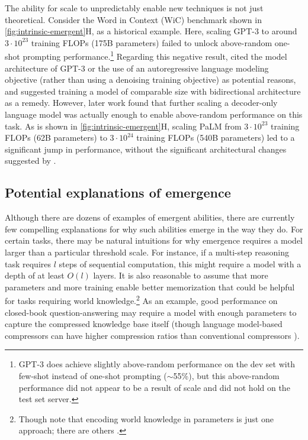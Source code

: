 \documentclass[10pt]{article} %
\begin{document}
The ability for scale to unpredictably enable new techniques is not just theoretical.
Consider the Word in Context (WiC) benchmark \citep{pilehvar-camacho-collados-2019-wic} shown in \cref{fig:intrinsic-emergent}H, as a historical example.
Here, scaling GPT-3 to around $3 \cdot 10^{23}$ training FLOPs (175B parameters) failed to unlock above-random one-shot prompting performance.\footnote{GPT-3 does achieve slightly above-random performance on the dev set with few-shot instead of one-shot prompting ($\sim$55\%), but this above-random performance did not appear to be a result of scale and did not hold on the test set server.}
Regarding this negative result, \citet{brown2020language} cited the model architecture of GPT-3 or the use of an autoregressive language modeling objective (rather than using a denoising training objective) as potential reasons, and suggested training a model of comparable size with bidirectional architecture as a remedy.
However, later work found that further scaling a decoder-only language model was actually enough to enable above-random performance on this task.
As is shown in \cref{fig:intrinsic-emergent}H, scaling PaLM \citep{chowdhery2022palm} from $3 \cdot 10^{23}$ training FLOPs (62B parameters) to $3 \cdot 10^{24}$ training FLOPs (540B parameters) led to a significant jump in performance, without the significant architectural changes suggested by \citet{brown2020language}.

\subsection{Potential explanations of emergence}\label{subsec:potential_explanations}
Although there are dozens of examples of emergent abilities, there are currently few compelling explanations for why such abilities emerge in the way they do.
For certain tasks, there may be natural intuitions for why emergence requires a model larger than a particular threshold scale.
For instance, if a multi-step reasoning task requires $l$ steps of sequential computation, this might require a model with a depth of at least $O\left(l\right)$ layers.
It is also reasonable to assume that more parameters and more training enable better memorization that could be helpful for tasks requiring world knowledge.\footnote{Though note that encoding world knowledge in parameters is just one approach; there are others \citep[e.g.,][]{guu2020realm,borgeaud2021improving}.}
As an example, good performance on closed-book question-answering may require a model with enough parameters to capture the compressed knowledge base itself (though language model-based compressors can have higher compression ratios than conventional compressors \citep{bellardlmcompressor}).
\end{document}

